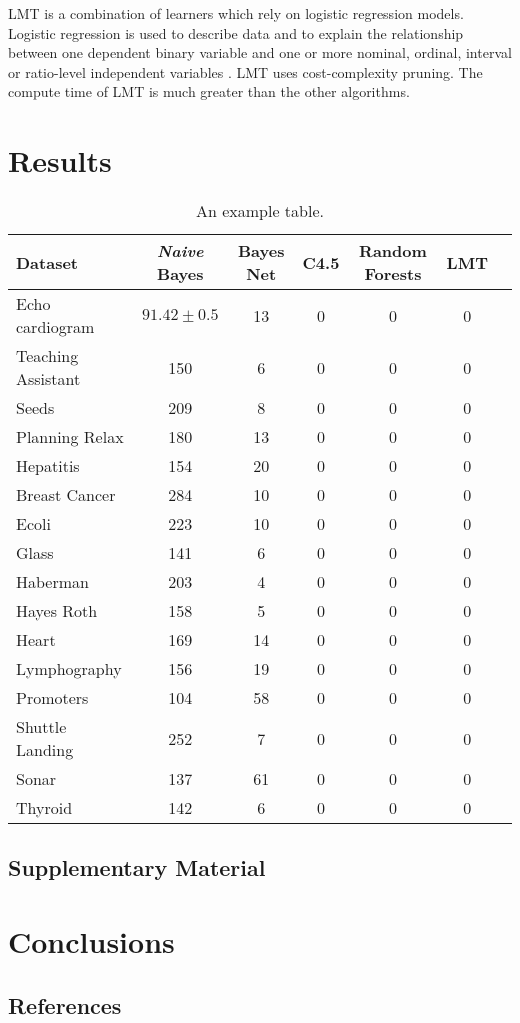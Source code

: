 \documentclass{cmppgr}
\begin{document}
LMT is a combination of learners which rely on logistic regression models.
Logistic regression is used to describe data and to explain the relationship between one dependent binary variable and one or more nominal, ordinal, interval or ratio-level independent variables \cite{statistics_solutions}. LMT uses cost-complexity pruning. The compute time of LMT is much greater than the other algorithms.

 
 
\section{Results}

\begin{table*}[t]
	\centering
	\caption{An example table.}
	\begin{tabular}{|l|c|c|c|c|c|c|}
		\hline
		Dataset & \textit{Naive} Bayes & Bayes Net & C4.5 &Random Forests & LMT \\\hline\hline
		Echo cardiogram & $91.42\pm0.5$  & 13 & 0 & 0 & 0\\
		Teaching Assistant & 150 & 6 & 0 & 0 & 0\\
		Seeds & 209 & 8 & 0 & 0 & 0\\
		Planning Relax & 180 & 13 & 0 & 0 & 0\\
		Hepatitis & 154 & 20 & 0 & 0 & 0\\
		Breast Cancer & 284 & 10 & 0 & 0 & 0\\
		Ecoli & 223 &10  & 0 & 0 & 0\\
		Glass & 141 &6   & 0 & 0 & 0\\
		Haberman & 203  &4 & 0 & 0  & 0\\
		Hayes Roth & 158 &5 & 0 & 0  & 0\\
		Heart & 169 & 14 & 0 & 0 & 0\\
		Lymphography & 156 &19 & 0  & 0 & 0\\
		Promoters & 104 &58 & 0  & 0  & 0\\
		Shuttle Landing & 252  &7 & 0 & 0 & 0 \\
		Sonar & 137 &61 & 0 & 0  & 0\\
		Thyroid & 142 & 6 & 0 & 0 & 0\\\hline
	\end{tabular}
	\label{tab:example}
\end{table*}






\subsection{Supplementary Material}


\section{Conclusions}


\subsection{References}




\end{document}
